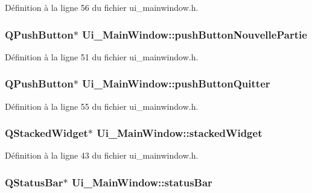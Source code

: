Définition à la ligne 56 du fichier ui\-\_\-mainwindow.\-h.

\hypertarget{class_ui___main_window_ad96a0a746b68d03e700e0bf4c899d389}{
\subsubsection[{push\-Button\-Nouvelle\-Partie}]{\setlength{\rightskip}{0pt plus 5cm}Q\-Push\-Button$\ast$ Ui\-\_\-\-Main\-Window\-::push\-Button\-Nouvelle\-Partie}}\label{class_ui___main_window_ad96a0a746b68d03e700e0bf4c899d389}


Définition à la ligne 51 du fichier ui\-\_\-mainwindow.\-h.

\hypertarget{class_ui___main_window_a87c454e9f790f364183054ad3596ea82}{
\subsubsection[{push\-Button\-Quitter}]{\setlength{\rightskip}{0pt plus 5cm}Q\-Push\-Button$\ast$ Ui\-\_\-\-Main\-Window\-::push\-Button\-Quitter}}\label{class_ui___main_window_a87c454e9f790f364183054ad3596ea82}


Définition à la ligne 55 du fichier ui\-\_\-mainwindow.\-h.

\hypertarget{class_ui___main_window_a8d440a6df1de0bc57afcdda7476d8f19}{
\subsubsection[{stacked\-Widget}]{\setlength{\rightskip}{0pt plus 5cm}Q\-Stacked\-Widget$\ast$ Ui\-\_\-\-Main\-Window\-::stacked\-Widget}}\label{class_ui___main_window_a8d440a6df1de0bc57afcdda7476d8f19}


Définition à la ligne 43 du fichier ui\-\_\-mainwindow.\-h.

\hypertarget{class_ui___main_window_a50fa481337604bcc8bf68de18ab16ecd}{
\subsubsection[{status\-Bar}]{\setlength{\rightskip}{0pt plus 5cm}Q\-Status\-Bar$\ast$ Ui\-\_\-\-Main\-Window\-::status\-Bar}}\label{class_ui___main_window_a50fa481337604bcc8bf68de18ab16ecd}



